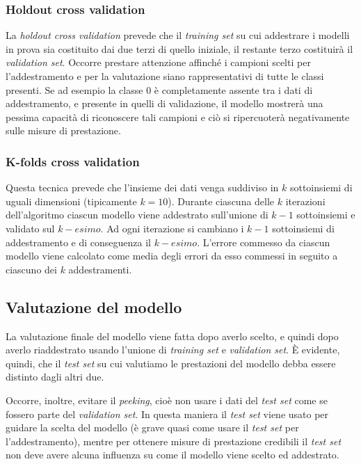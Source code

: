 \subsubsection{Holdout cross validation}
La \emph{holdout cross validation} prevede che il \emph{training set } su cui addestrare i modelli in prova sia costituito dai due terzi di quello iniziale, il restante terzo costituirà il \emph{validation set}. Occorre prestare attenzione affinché i campioni scelti per l'addestramento e per la valutazione siano rappresentativi di tutte le classi presenti. Se ad esempio la classe 0 è completamente assente tra i dati di addestramento, e presente in quelli di validazione, il modello mostrerà una pessima capacità di riconoscere tali campioni e ciò si ripercuoterà negativamente sulle misure di prestazione.


\subsubsection{K-folds cross validation}
Questa tecnica prevede che l'insieme dei dati venga suddiviso in $k$ sottoinsiemi di uguali dimensioni (tipicamente $k=10$). Durante ciascuna delle $k$ iterazioni dell'algoritmo ciascun modello viene addestrato sull'unione di $k-1$ sottoinsiemi e validato sul $k-esimo$. Ad ogni iterazione si cambiano i $k-1$ sottoinsiemi di addestramento e di conseguenza il $k-esimo$. L'errore commesso da ciascun modello viene calcolato come media degli errori da esso commessi in seguito a ciascuno dei $k$ addestramenti.

\subsection{Valutazione del modello}
La valutazione finale del modello viene fatta dopo averlo scelto, e quindi dopo averlo riaddestrato usando l'unione di \emph{training set} e \emph{validation set}. È evidente, quindi, che il \emph{test set} su cui valutiamo le prestazioni del modello debba essere distinto dagli altri due.

Occorre, inoltre, evitare il \emph{peeking}, cioè non usare i dati del \emph{test set} come se fossero parte del \emph{validation set}. In questa maniera il \emph{test set} viene usato per guidare la scelta del modello (è grave quasi come usare il \emph{test set} per l'addestramento), mentre per ottenere misure di prestazione credibili il \emph{test set} non deve avere alcuna influenza su come il modello viene scelto ed addestrato.


